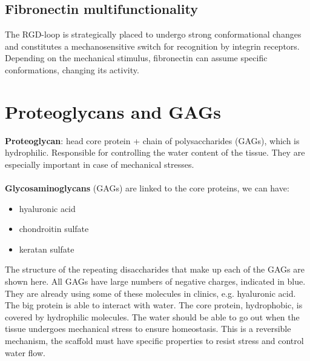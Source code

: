 \subsection{Fibronectin multifunctionality}
The RGD-loop is strategically placed to undergo strong conformational changes and constitutes a mechanosensitive switch for recognition by integrin receptors.
Depending on the mechanical stimulus, fibronectin can assume specific conformations, changing its activity.

\section{Proteoglycans and GAGs}

\textbf{Proteoglycan}: head core protein + chain of polysaccharides (GAGs), which is hydrophilic. Responsible for controlling the water content of the tissue.
They are especially important in case of mechanical stresses.
\\
\\
\noindent
\textbf{Glycosaminoglycans} (GAGs) are linked to the core proteins, we can have:
\begin{itemize}
\item hyaluronic acid
\item chondroitin sulfate
\item keratan sulfate
\end{itemize}
\noindent
The structure of the repeating disaccharides that make up each of the GAGs are shown here.
All GAGs have large numbers of negative charges, indicated in blue.
They are already using some of these molecules in clinics, e.g. hyaluronic acid.
The big protein is able to interact with water.
The core protein, hydrophobic, is covered by hydrophilic molecules.
The water should be able to go out when the tissue undergoes mechanical stress to ensure homeostasis.
This is a reversible mechanism,  the scaffold must have specific properties to resist stress and control water flow.


